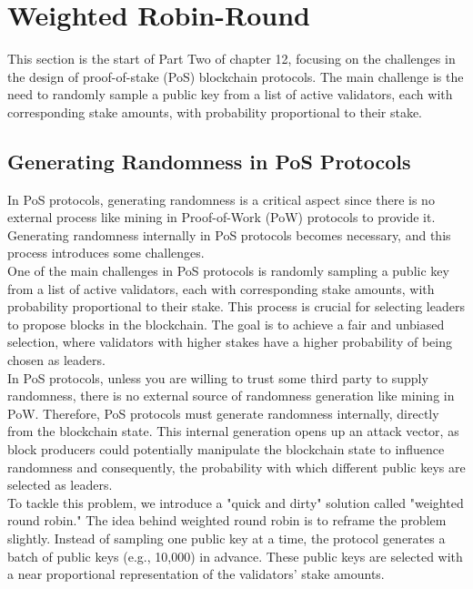\section{Weighted Robin-Round}
This section is the start of Part Two of chapter 12, focusing on the challenges in the design of proof-of-stake (PoS) blockchain protocols. The main challenge is the need to randomly sample a public key from a list of active validators, each with corresponding stake amounts, with probability proportional to their stake.

\subsection{Generating Randomness in PoS Protocols}
In PoS protocols, generating randomness is a critical aspect since there is no external process like mining in Proof-of-Work (PoW) protocols to provide it. Generating randomness internally in PoS protocols becomes necessary, and this process introduces some challenges.\\
One of the main challenges in PoS protocols is randomly sampling a public key from a list of active validators, each with corresponding stake amounts, with probability proportional to their stake. This process is crucial for selecting leaders to propose blocks in the blockchain. The goal is to achieve a fair and unbiased selection, where validators with higher stakes have a higher probability of being chosen as leaders.\\
In PoS protocols, unless you are willing to trust some third party to supply randomness, there is no external source of randomness generation like mining in PoW. Therefore, PoS protocols must generate randomness internally, directly from the blockchain state. This internal generation opens up an attack vector, as block producers could potentially manipulate the blockchain state to influence randomness and consequently, the probability with which different public keys are selected as leaders.\\
To tackle this problem, we introduce a "quick and dirty" solution called "weighted round robin." The idea behind weighted round robin is to reframe the problem slightly. Instead of sampling one public key at a time, the protocol generates a batch of public keys (e.g., 10,000) in advance. These public keys are selected with a near proportional representation of the validators' stake amounts.\\

